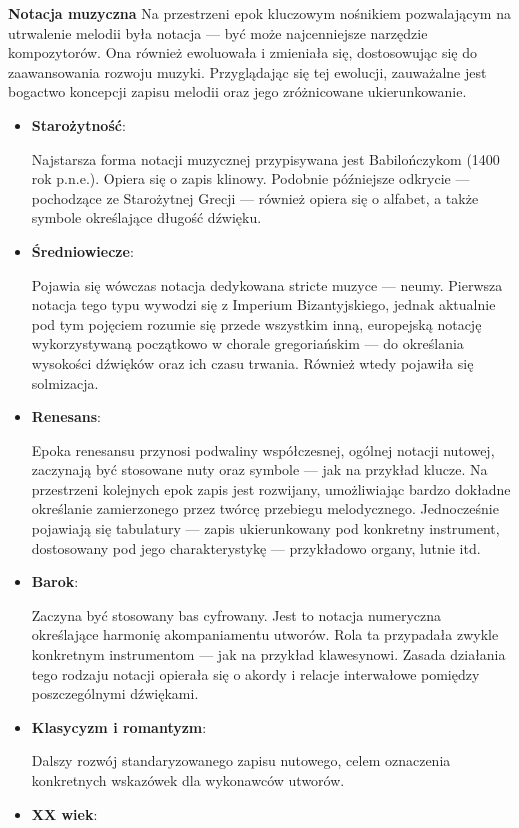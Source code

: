 \documentclass[12pt]{article}
\begin{document}
\textbf{Notacja muzyczna}
Na przestrzeni epok kluczowym nośnikiem pozwalającym na utrwalenie melodii była notacja — być może najcenniejsze narzędzie kompozytorów.
Ona również ewoluowała i zmieniała się, dostosowując się do zaawansowania rozwoju muzyki.
Przyglądając się tej ewolucji, zauważalne jest bogactwo koncepcji zapisu melodii oraz jego zróżnicowane ukierunkowanie.
\begin{itemize}
	\item \textbf{Starożytność}:
	      
	      Najstarsza forma notacji muzycznej przypisywana jest Babilończykom (1400 rok p.n.e.).
	      Opiera się o zapis klinowy.
	      Podobnie późniejsze odkrycie — pochodzące ze Starożytnej Grecji — również opiera się o alfabet,
	      a także symbole określające długość dźwięku.
	\item \textbf{Średniowiecze}:
	      
	      Pojawia się wówczas notacja dedykowana stricte muzyce — neumy. Pierwsza notacja tego typu wywodzi się z Imperium Bizantyjskiego,
	      jednak aktualnie pod tym pojęciem rozumie się przede wszystkim inną, europejską notację wykorzystywaną początkowo w chorale
	      gregoriańskim — do określania wysokości dźwięków oraz ich czasu trwania.
	      Również wtedy pojawiła się solmizacja.
	\item \textbf{Renesans}:
	      
	      Epoka renesansu przynosi podwaliny współczesnej, ogólnej notacji nutowej, zaczynają być stosowane nuty oraz symbole
	      — jak na przykład klucze.
	      Na przestrzeni kolejnych epok zapis jest rozwijany, umożliwiając bardzo dokładne określanie zamierzonego przez twórcę przebiegu
	      melodycznego.
	      Jednocześnie pojawiają się tabulatury — zapis ukierunkowany pod konkretny instrument, dostosowany pod jego charakterystykę —
	      przykładowo organy, lutnie itd.
	\item \textbf{Barok}:
	      
	      Zaczyna być stosowany bas cyfrowany.
	      Jest to notacja numeryczna określające harmonię akompaniamentu utworów.
	      Rola ta przypadała zwykle konkretnym instrumentom — jak na przykład klawesynowi.
	      Zasada działania tego rodzaju notacji opierała się o akordy i relacje interwałowe pomiędzy poszczególnymi dźwiękami.
	\item \textbf{Klasycyzm i romantyzm}:
	      
	      Dalszy rozwój standaryzowanego zapisu nutowego, celem oznaczenia konkretnych wskazówek dla wykonawców utworów.
	\item \textbf{XX wiek}:
	      

\end{itemize}
\end{document}
